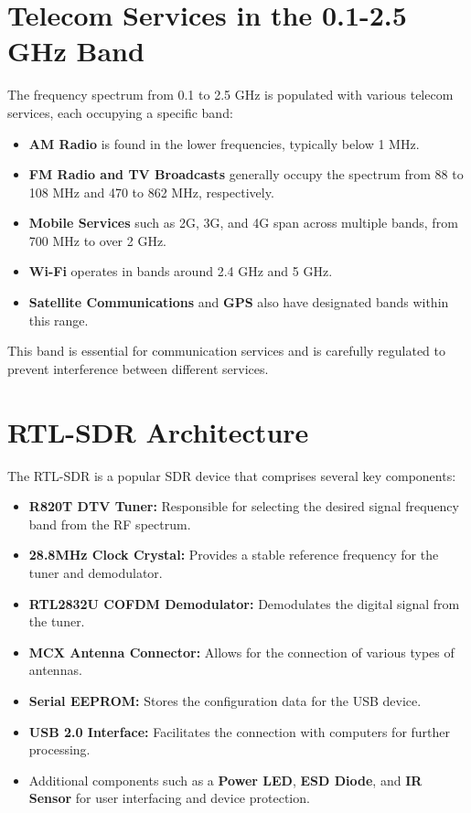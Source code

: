 \section*{Telecom Services in the 0.1-2.5 GHz Band}

The frequency spectrum from 0.1 to 2.5 GHz is populated with various telecom services, each occupying a specific band:
\begin{itemize}
    \item \textbf{AM Radio} is found in the lower frequencies, typically below 1 MHz.
    \item \textbf{FM Radio and TV Broadcasts} generally occupy the spectrum from 88 to 108 MHz and 470 to 862 MHz, respectively.
    \item \textbf{Mobile Services} such as 2G, 3G, and 4G span across multiple bands, from 700 MHz to over 2 GHz.
    \item \textbf{Wi-Fi} operates in bands around 2.4 GHz and 5 GHz.
    \item \textbf{Satellite Communications} and \textbf{GPS} also have designated bands within this range.
\end{itemize}
This band is essential for communication services and is carefully regulated to prevent interference between different services.

\section*{RTL-SDR Architecture}

The RTL-SDR is a popular SDR device that comprises several key components:
\begin{itemize}
    \item \textbf{R820T DTV Tuner:} Responsible for selecting the desired signal frequency band from the RF spectrum.
    \item \textbf{28.8MHz Clock Crystal:} Provides a stable reference frequency for the tuner and demodulator.
    \item \textbf{RTL2832U COFDM Demodulator:} Demodulates the digital signal from the tuner.
    \item \textbf{MCX Antenna Connector:} Allows for the connection of various types of antennas.
    \item \textbf{Serial EEPROM:} Stores the configuration data for the USB device.
    \item \textbf{USB 2.0 Interface:} Facilitates the connection with computers for further processing.
    \item Additional components such as a \textbf{Power LED}, \textbf{ESD Diode}, and \textbf{IR Sensor} for user interfacing and device protection.
\end{itemize}

